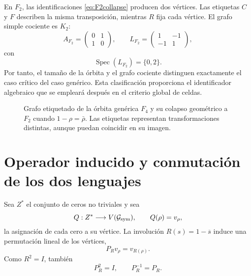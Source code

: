 \documentclass[11pt]{amsart}
\theoremstyle{definition}
\theoremstyle{remark}
\begin{document}
En $F_2$, las identificaciones \eqref{eq:F2collapse} producen dos vértices. Las etiquetas $C$ y $F$ describen la misma transposición, mientras $R$ fija cada vértice. El grafo simple cociente es $K_2$:
\begin{equation}
A_{F_2}=\begin{pmatrix}0&1\\1&0\end{pmatrix},\qquad
L_{F_2}=\begin{pmatrix}1&-1\\-1&1\end{pmatrix},
\end{equation}
con
\begin{equation}
 \operatorname{Spec}(L_{F_2})=\{0,2\}.
\end{equation}
Por tanto, el tamaño de la órbita y el grafo cociente distinguen exactamente el caso crítico del caso genérico. Esta clasificación proporciona el identificador algebraico que se empleará después en el criterio global de celdas.

\begin{figure}[t]
\centering
{}
\caption{Grafo etiquetado de la órbita genérica $F_4$ y su colapso geométrico a $F_2$ cuando $1-\rho=\bar\rho$. Las etiquetas representan transformaciones distintas, aunque puedan coincidir en su imagen.}
\label{fig:symgraph}
\end{figure}

\section{Operador inducido y conmutación de los dos lenguajes}
Sea $Z^*$ el conjunto de ceros no triviales y sea
\[
Q:Z^*\longrightarrow V(\mathcal G_{\rm sym}),\qquad Q(\rho)=v_{\rho},
\]
la asignación de cada cero a su vértice. La involución $R(s)=1-\overline{s}$ induce una permutación lineal de los vértices,
\begin{equation}\label{eq:PR}
P_R v_{\rho}=v_{R(\rho)}.
\end{equation}
Como $R^2=I$, también
\begin{equation}
P_R^2=I,\qquad P_R^{-1}=P_R.
\end{equation}
\end{document}
